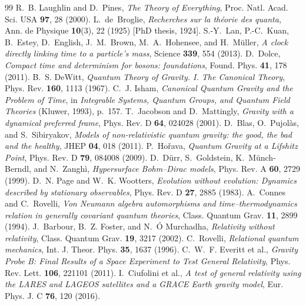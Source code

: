 \documentclass[11pt]{article}
\begin{document}
\begin{thebibliography}{99}\small
{} R.~B. Laughlin and D.~Pines, \emph{The Theory of Everything}, Proc. Natl. Acad. Sci. USA \textbf{97}, 28 (2000).
 L.~de~Broglie, \emph{Recherches sur la th\'eorie des quanta}, Ann. de Physique \textbf{10}(3), 22 (1925) [PhD thesis, 1924].
 S.-Y.~Lan, P.-C.~Kuan, B.~Estey, D.~English, J.~M.~Brown, M.~A.~Hohensee, and H.~M\"uller, \emph{A clock directly linking time to a particle's mass}, Science \textbf{339}, 554 (2013).
 D.~Dolce, \emph{Compact time and determinism for bosons: foundations}, Found. Phys. \textbf{41}, 178 (2011).
 B.~S. DeWitt, \emph{Quantum Theory of Gravity. I. The Canonical Theory}, Phys. Rev. \textbf{160}, 1113 (1967).
 C.~J. Isham, \emph{Canonical Quantum Gravity and the Problem of Time}, in \emph{Integrable Systems, Quantum Groups, and Quantum Field Theories} (Kluwer, 1993), p.~157.
 T.~Jacobson and D.~Mattingly, \emph{Gravity with a dynamical preferred frame}, Phys. Rev. D \textbf{64}, 024028 (2001).
 D.~Blas, O.~Pujol\`as, and S.~Sibiryakov, \emph{Models of non-relativistic quantum gravity: the good, the bad and the healthy}, JHEP \textbf{04}, 018 (2011).
 P.~Ho\v{r}ava, \emph{Quantum Gravity at a Lifshitz Point}, Phys. Rev. D \textbf{79}, 084008 (2009).
 D.~D\"urr, S.~Goldstein, K.~M\"unch-Berndl, and N.~Zangh\`i, \emph{Hypersurface Bohm--Dirac models}, Phys. Rev. A \textbf{60}, 2729 (1999).
 D.~N. Page and W.~K. Wootters, \emph{Evolution without evolution: Dynamics described by stationary observables}, Phys. Rev. D \textbf{27}, 2885 (1983).
 A.~Connes and C.~Rovelli, \emph{Von Neumann algebra automorphisms and time--thermodynamics relation in generally covariant quantum theories}, Class. Quantum Grav. \textbf{11}, 2899 (1994).
 J.~Barbour, B.~Z. Foster, and N.~\'O Murchadha, \emph{Relativity without relativity}, Class. Quantum Grav. \textbf{19}, 3217 (2002).
 C.~Rovelli, \emph{Relational quantum mechanics}, Int. J. Theor. Phys. \textbf{35}, 1637 (1996).
 C.~W.~F. Everitt et al., \emph{Gravity Probe B: Final Results of a Space Experiment to Test General Relativity}, Phys. Rev. Lett. \textbf{106}, 221101 (2011).
 I.~Ciufolini et al., \emph{A test of general relativity using the LARES and LAGEOS satellites and a GRACE Earth gravity model}, Eur. Phys. J. C \textbf{76}, 120 (2016).

\end{thebibliography}
\end{document}
